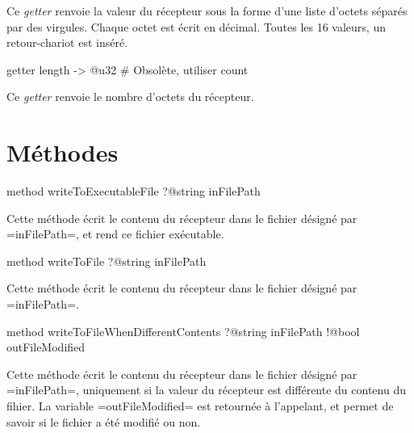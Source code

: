 Ce \emph{getter} renvoie la valeur du récepteur sous la forme d'une liste d'octets séparés par des virgules. Chaque octet est écrit en décimal. Toutes les 16 valeurs, un retour-chariot est inséré.




\begin{galgas4}
getter length -> @u32 # Obsolète, utiliser count
\end{galgas4}

Ce \emph{getter} renvoie le nombre d'octets du récepteur.





\section{Méthodes}



\begin{galgas4}
method writeToExecutableFile ?@string inFilePath
\end{galgas4}

Cette méthode écrit le contenu du récepteur dans le fichier désigné par \ggsq=inFilePath=, et rend ce fichier exécutable.





\begin{galgas4}
method writeToFile ?@string inFilePath
\end{galgas4}

Cette méthode écrit le contenu du récepteur dans le fichier désigné par \ggsq=inFilePath=.





\begin{galgas4}
method writeToFileWhenDifferentContents
  ?@string inFilePath
  !@bool outFileModified
\end{galgas4}

Cette méthode écrit le contenu du récepteur dans le fichier désigné par \ggsq=inFilePath=, uniquement si la valeur du récepteur est différente du contenu du fihier. La variable \ggsq=outFileModified= est retournée à l'appelant, et permet de savoir si le fichier a été modifié ou non.







